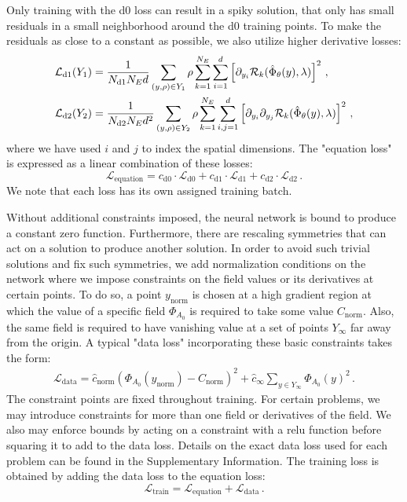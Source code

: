 \documentclass[fleqn,11pt]{wlscirep}
\begin{document}
Only training with the d0 loss can result in a spiky solution, that only has small residuals in a small neighborhood around the d0 training points. To make the residuals as close to a constant as possible, we also utilize higher derivative losses:
\begin{align}
    \mathcal{L}_\text{d1}(Y_1) &= {1 \over N_\text{d1} N_E d} \sum_{(y, \rho) \in Y_1} \rho \sum_{k=1}^{N_E} \sum_{i=1}^d \left[ \partial_{y_i} \mathcal{R}_k(\hat{\Phi}_\theta(y), \lambda) \right]^2\,, \\
    \mathcal{L}_\text{d2}(Y_2) &= {1 \over N_\text{d2} N_E d^2} \sum_{(y, \rho) \in Y_2} \rho \sum_{k=1}^{N_E} \sum_{i, j=1}^{d} \left[ \partial_{y_i} \partial_{y_j} \mathcal{R}_k(\hat{\Phi}_\theta(y), \lambda) \right]^2\,,    
\end{align}
where we have used $i$ and $j$ to index the spatial dimensions. The "equation loss" is expressed as a linear combination of these losses:
\begin{equation}
    \mathcal{L}_\text{equation} = 
    c_\text{d0} \cdot \mathcal{L}_\text{d0} +
    c_\text{d1} \cdot \mathcal{L}_\text{d1} +
    c_\text{d2} \cdot \mathcal{L}_\text{d2} \,.
\end{equation}
We note that each loss has its own assigned training batch.

Without additional constraints imposed, the neural network is bound to produce a constant zero function. Furthermore, there are rescaling symmetries that can act on a solution to produce another solution. In order to avoid such trivial solutions and fix such symmetries, we add normalization conditions on the network where we impose constraints on the field values or its derivatives at certain points. To do so, a point $y_\text{norm}$ is chosen at a high gradient region at which the value of a specific field $\Phi_{A_0}$ is required to take some value $C_\text{norm}$. Also, the same field is required to have vanishing value at a set of points $Y_\infty$ far away from the origin. A typical "data loss" incorporating these basic constraints takes the form:
\begin{align}
    \mathcal{L}_\text{data} = 
    \hat{c}_\text{norm} \left(\Phi_{A_0}(y_\text{norm}) - C_\text{norm}\right)^2 
    + \hat{c}_\infty \sum_{y \in Y_\infty} \Phi_{A_0}(y)^2 \,.
\end{align}
The constraint points are fixed throughout training. For certain problems, we may introduce constraints for more than one field or derivatives of the field. We also may enforce bounds by acting on a constraint with a relu function before squaring it to add to the data loss. Details on the exact data loss used for each problem can be found in the Supplementary Information. The training loss is obtained by adding the data loss to the equation loss:
\begin{equation}
    \mathcal{L}_\text{train} = \mathcal{L}_\text{equation} + \mathcal{L}_\text{data} \,.
\end{equation}
\end{document}
